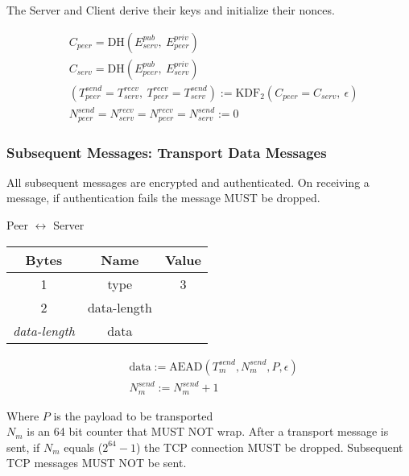 The Server and Client derive their keys and initialize their nonces.

\begin{align*}
    & C_{peer} = \text{DH}(E_{serv}^{pub},\ E_{peer}^{priv})\\
    & C_{serv} = \text{DH}(E_{peer}^{pub},\ E_{serv}^{priv})\\
    & (T_{peer}^{send} = T_{serv}^{recv},\ T_{peer}^{recv} = T_{serv}^{send}) := \text{KDF}_2(C_{peer} = C_{serv},
    \ \epsilon) \\
    & N_{peer}^{send} = N_{serv}^{recv} = N_{peer}^{recv} = N_{serv}^{send} := 0
\end{align*}

\subsubsection{Subsequent Messages: Transport Data Messages}

All subsequent messages are encrypted and authenticated. On receiving a message, if authentication fails the message
MUST be dropped.

\begin{center}
    Peer $\leftrightarrow$ Server\\
    \begin{tabular}{|c|c|c|}
        \hline
        \textbf{Bytes}     & \textbf{Name} & \textbf{Value} \\
        \hline
        1                  & type          & 3              \\
        \hline
        2                  & data-length   &                \\
        \hline
        \emph{data-length} & data          &                \\
        \hline
    \end{tabular}
\end{center}

\begin{align*}
    & \text{data} := \text{AEAD}(T_{m}^{send}, N_{m}^{send}, P, \epsilon) \\
    & N_{m}^{send} := N_{m}^{send} + 1
\end{align*}

Where $P$ is the payload to be transported\\

$N_{m}$ is an 64 bit counter that MUST NOT wrap. After a transport message is sent, if $N_{m}$ equals
($2^{64}-1$) the TCP connection MUST be dropped. Subsequent TCP messages MUST NOT be sent. \\

